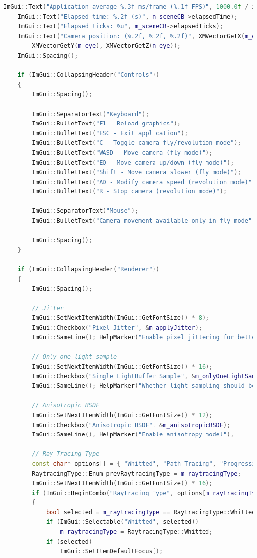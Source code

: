 \documentclass[12pt,a4paper]{report}
\numberwithin{equation}{section} %
\begin{document}
\begin{appendices}
\begin{lstlisting}[caption={Compunerea meniului ImGui},label={lst:showui},language=C++]
	ImGui::Text("Application average %.3f ms/frame (%.1f FPS)", 1000.0f / io.Framerate, io.Framerate);
	ImGui::Text("Elapsed time: %.2f (s)", m_sceneCB->elapsedTime);
	ImGui::Text("Elapsed ticks: %u", m_sceneCB->elapsedTicks);
	ImGui::Text("Camera position: (%.2f, %.2f, %.2f)", XMVectorGetX(m_eye),
		XMVectorGetY(m_eye), XMVectorGetZ(m_eye));
	ImGui::Spacing();

	if (ImGui::CollapsingHeader("Controls"))
	{
		ImGui::Spacing();

		ImGui::SeparatorText("Keyboard");
		ImGui::BulletText("F1 - Reload graphics");
		ImGui::BulletText("ESC - Exit application");
		ImGui::BulletText("C - Toggle camera fly/revolution mode");
		ImGui::BulletText("WASD - Move camera (fly mode)");
		ImGui::BulletText("EQ - Move camera up/down (fly mode)");
		ImGui::BulletText("Shift - Move camera slower (fly mode)");
		ImGui::BulletText("AD - Modify camera speed (revolution mode)");
		ImGui::BulletText("R - Stop camera (revolution mode)");

		ImGui::SeparatorText("Mouse");
		ImGui::BulletText("Camera movement available only in fly mode");

		ImGui::Spacing();
	}

	if (ImGui::CollapsingHeader("Renderer"))
	{
		ImGui::Spacing();

		// Jitter
		ImGui::SetNextItemWidth(ImGui::GetFontSize() * 8);
		ImGui::Checkbox("Pixel Jitter", &m_applyJitter);
		ImGui::SameLine(); HelpMarker("Enable pixel jittering for better sampling of the scene");

		// Only one light sample
		ImGui::SetNextItemWidth(ImGui::GetFontSize() * 16);
		ImGui::Checkbox("Single LightBuffer Sample", &m_onlyOneLightSample);
		ImGui::SameLine(); HelpMarker("Whether light sampling should be done one at a time or all at once");

		// Anisotropic BSDF
		ImGui::SetNextItemWidth(ImGui::GetFontSize() * 12);
		ImGui::Checkbox("Anisotropic BSDF", &m_anisotropicBSDF);
		ImGui::SameLine(); HelpMarker("Enable anisotropy model");

		// Ray Tracing Type
		const char* options[] = { "Whitted", "Path Tracing", "Progressive Path Tracing" };
		RaytracingType::Enum prevRaytracingType = m_raytracingType;
		ImGui::SetNextItemWidth(ImGui::GetFontSize() * 16);
		if (ImGui::BeginCombo("Raytracing Type", options[m_raytracingType]))
		{
			bool selected = m_raytracingType == RaytracingType::Whitted;
			if (ImGui::Selectable("Whitted", selected))
				m_raytracingType = RaytracingType::Whitted;
			if (selected)
				ImGui::SetItemDefaultFocus();


\end{lstlisting}
\end{appendices}
\end{document}
